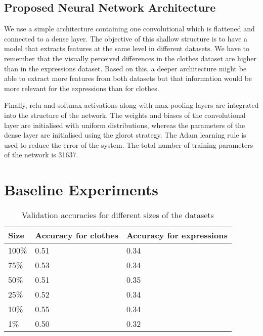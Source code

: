 \documentclass{article}
\begin{document}
\subsection{Proposed Neural Network Architecture}
\label{sec:arch}

We use a simple architecture containing one convolutional which is flattened and connected to a dense layer. The objective of this shallow structure is to have a model that extracts features at the same level in different datasets. We have to remember that the visually perceived differences in the clothes dataset are higher than in the expressions dataset. Based on this, a deeper architecture might be able to extract more features from both datasets but that information would be more relevant for the expressions than for clothes.

Finally, relu and softmax activations along with max pooling layers are integrated into the structure of the network. The weights and biases of the convolutional layer are initialised with uniform distributions, whereas the parameters of the dense layer are initialised using the glorot strategy. The Adam learning rule is used to reduce the error of the system.  The total number of training parameters of the network is 31637. 


\section{Baseline Experiments}
\label{sec:baseline}

\begin{table*}[!htb]
  \centering
  \begin{tabular}{| l | l | l |}
    \hline
    \textbf{Size} & \textbf{Accuracy for clothes} & \textbf{Accuracy for expressions}\\ \hline
    100\% & 0.51 & 0.34\\ \hline
    75\% & 0.53  & 0.34\\ \hline
    50\% & 0.51 & 0.35\\ \hline
	25\% & 0.52 & 0.34\\ \hline
	10\% & 0.55 & 0.34\\ \hline
	1\% & 0.50 & 0.32\\ \hline

  \end{tabular}
  \caption{Validation accuracies for different sizes of the datasets}
  \label{tab:2}
\end{table*}
\end{document}

